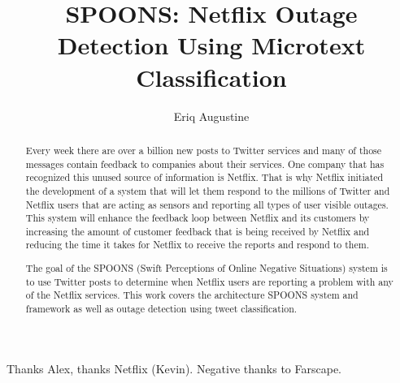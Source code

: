 \documentclass[12pt]{ucthesis}
\begin{document}

\title{SPOONS: Netflix Outage Detection Using Microtext Classification}
\author{Eriq Augustine}
  
 
      

\maketitle

\begin{frontmatter}

\copyrightpage

\committeemembershippage

\begin{abstract}

Every week there are over a billion new posts to Twitter services and many of
those messages contain feedback to companies about their services. One company
that has recognized this unused source of information is Netflix. That is why
Netflix initiated the development of a system that will let them respond to the
millions of Twitter and Netflix users that are acting as sensors and reporting all types of user
visible outages. This system will enhance the feedback loop between Netflix and
its customers by increasing the amount of customer feedback that is being
received by Netflix and reducing the time it takes for Netflix to receive the
reports and respond to them.

The goal of the SPOONS (Swift Perceptions of Online Negative Situations) system
is to use Twitter posts to determine when Netflix users are reporting a problem
with any of the Netflix services. This work covers the architecture SPOONS system and framework
as well as outage detection using tweet classification.

\end{abstract}

\begin{acknowledgements}

Thanks Alex, thanks Netflix (Kevin).
Negative thanks to Farscape.

\end{acknowledgements}

\tableofcontents

\listoftables

\listoffigures

\end{frontmatter}
\end{document}
